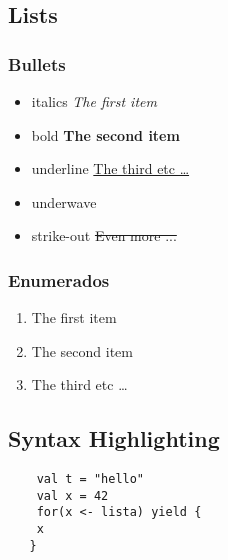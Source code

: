 \documentclass[12pt]{article}  %
\begin{document}
\subsection{Lists}

\subsubsection{Bullets}

\begin{itemize}
  \item italics \textit{The first item}
  \item bold \textbf{The second item}
  \item underline \uline{The third etc \ldots}
  \item underwave 
  \item strike-out \sout{Even more ...}
\end{itemize}

\subsubsection{Enumerados}

\begin{enumerate}
  \item The first item
  \item The second item
  \item The third etc \ldots
\end{enumerate}

\subsection{Syntax Highlighting}

\begin{lstlisting}
    val t = "hello" 
    val x = 42 
    for(x <- lista) yield {
 	x
   }
\end{lstlisting}
\end{document}
